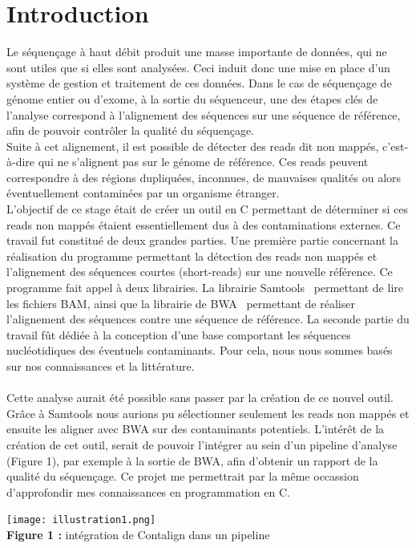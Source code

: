 \documentclass[a4paper,12pt]{article}
\begin{document}
\section{Introduction}

Le séquençage à haut débit produit une masse importante de données, qui ne sont utiles que si elles sont analysées. Ceci induit donc une mise en place d'un système de gestion et traitement de ces données. Dans le cas de séquençage de génome entier ou d'exome, à la sortie du séquenceur, une des étapes clés de l'analyse correspond à l'alignement des séquences sur une séquence de référence, afin de pouvoir contrôler la qualité du séquençage. \\
Suite à cet alignement, il est possible de détecter des reads dit non mappés, c'est-à-dire qui ne s'alignent pas sur le génome de référence.
Ces reads peuvent correspondre à des régions dupliquées, inconnues, de mauvaises qualités ou alors éventuellement contaminées par un organisme étranger. \\

L'objectif de ce stage était de créer un outil en C permettant de déterminer si ces reads non mappés étaient essentiellement dus à des contaminations externes. Ce travail fut constitué de deux grandes parties. Une première partie concernant la réalisation du programme permettant la détection des reads non mappés et l'alignement des séquences courtes (short-reads) sur une nouvelle référence. Ce programme fait appel à deux librairies. La librairie Samtools~\cite{SAM} permettant de lire les fichiers BAM, ainsi que la librairie de BWA~\cite{BWA} permettant de réaliser l'alignement des séquences contre une séquence de référence. La seconde partie du travail fût dédiée à la conception d'une base comportant les séquences nucléotidiques des éventuels contaminants. Pour cela, nous nous sommes basés sur nos connaissances et la littérature. \\\\
Cette analyse aurait été possible sans passer par la création de ce nouvel outil. Grâce à Samtools nous aurions pu sélectionner seulement les reads non mappés et ensuite les aligner avec BWA sur des contaminants potentiels. L'intérêt de la création de cet outil, serait de pouvoir l'intégrer au sein d'un pipeline d'analyse (Figure 1), par exemple à la sortie de BWA, afin d'obtenir un rapport de la qualité du séquençage. Ce projet me permettrait par la même occassion d'approfondir mes connaissances en programmation en C. 
\begin{center}
\texttt{[image: illustration1.png]}~\\
\textbf{Figure 1 :} intégration de Contalign dans un pipeline
\end{center}
\end{document}
